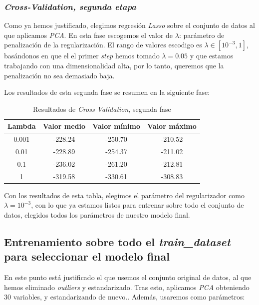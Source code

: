 \documentclass[11pt]{article}
\begin{document}
\subsubsection{\emph{Cross-Validation, segunda etapa}}

Como ya hemos justificado, elegimos regresión \emph{Lasso} sobre el conjunto de datos al que aplicamos \emph{PCA}.
En esta fase escogemos el valor de $\lambda$: parámetro de penalización de la regularización. El rango de valores escodigo es $\lambda \in [10^{-3}, 1]$, basándonos en que el el primer \emph{step} hemos tomado $\lambda = 0.05$ y que estamos trabajando con una dimensionalidad alta, por lo tanto, queremos que la penalización no sea demasiado baja.

Los resultados de esta segunda fase se resumen en la siguiente fase:

\begin{table}[H]
    \centering
    \begin{tabular}{|c|c|c|c|}
        \hline
        \textbf{Lambda} & \textbf{Valor medio} & \textbf{Valor mínimo} & \textbf{Valor máximo} \\
        \hline
        0.001 & -228.24 & -250.70 & -210.52 \\
        0.01  & -228.89 & -254.37 & -211.02 \\
        0.1   & -236.02 & -261.20 & -212.81 \\
        1     & -319.58 & -330.61 & -308.83 \\
        \hline
    \end{tabular}
    \caption{Resultados de \emph{Cross Validation}, segunda fase}
\end{table}

Con los resultados de esta tabla, elegimos el parámetro del regularizador como $\lambda = 10^{-3}$, con lo que ya estamos listos para entrenar sobre todo el conjunto de datos, elegidos todos los parámetros de nuestro modelo final.

\pagebreak
\subsection{Entrenamiento sobre todo el \emph{train\_dataset} para seleccionar el modelo final}

En este punto está justificado el que usemos el conjunto original de datos, al que hemos eliminado \emph{outliers} y estandarizado. Tras esto, aplicamos \emph{PCA} obteniendo 30 variables, y estandarizando de nuevo.. Además, usaremos como parámetros:
\end{document}
